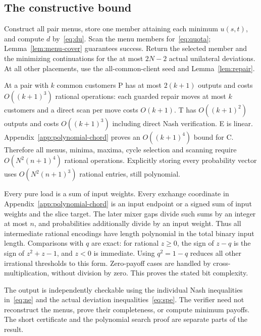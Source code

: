 \documentclass[11pt]{amsart}
\numberwithin{equation}{section}
\theoremstyle{definition}
\begin{document}
\subsection{The constructive bound}\label{sec:algorithm}
Construct all pair menus, store one member attaining each minimum $u(s,t)$, and compute $d$ by~\eqref{eq:du}. Scan the menu members for~\eqref{eq:quota}; Lemma~\ref{lem:menu-cover} guarantees success. Return the selected member and the minimizing continuations for the at most $2N-2$ actual unilateral deviations. At all other placements, use the all-common-client seed and Lemma~\ref{lem:repair}.

At a pair with $k$ common customers P has at most $2(k+1)$ outputs and
costs $O((k+1)^3)$ rational operations: each guarded repair moves at most
$k$ customers and a direct scan per move costs $O(k+1)$.
T has $O((k+1)^2)$ outputs and costs $O((k+1)^3)$ including direct Nash
verification. E is linear. Appendix~\ref{app:polynomial-chord} proves an
$O((k+1)^4)$ bound for C. Therefore all menus, minima, maxima, cycle
selection and scanning require $O(N^2(n+1)^4)$ rational operations.
Explicitly storing every probability vector uses
$O(N^2(n+1)^3)$ rational entries, still polynomial.

Every pure load is a sum of input weights. Every exchange coordinate in
Appendix~\ref{app:polynomial-chord} is an input endpoint or a signed sum
of input weights and the slice target. The later mixer gaps divide such
sums by an integer at most $n$, and probabilities additionally divide by
an input weight. Thus all intermediate rational encodings have length
polynomial in the total binary input length. Comparisons with $q$ are
exact: for rational $z\ge0$, the sign of $z-q$ is the sign of
$z^2+z-1$, and $z<0$ is immediate. Using $q^2=1-q$ reduces all other
irrational thresholds to this form. Zero-payoff cases are handled by
cross-multiplication, without division by zero. This proves the stated bit complexity.

The output is independently checkable using the individual Nash inequalities
in~\eqref{eq:ne} and the actual deviation inequalities~\eqref{eq:spe}. The
verifier need not reconstruct the menus, prove their completeness, or
compute minimum payoffs. The short certificate and the polynomial search
proof are separate parts of the result.


\appendix
\end{document}
